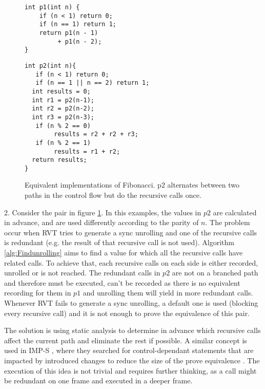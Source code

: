 \begin{figure}[h]
\begin{center}
\begin{minipage}{7 cm}
\begin{lstlisting}
int p1(int n) {
    if (n < 1) return 0;
    if (n == 1) return 1;
    return p1(n - 1) 
         + p1(n - 2);
}
\end{lstlisting}
\end{minipage}
\begin{minipage}{7 cm}
\begin{lstlisting}
int p2(int n){
   if (n < 1) return 0;
   if (n == 1 || n == 2) return 1; 
  int results = 0;
  int r1 = p2(n-1);
  int r2 = p2(n-2);
  int r3 = p2(n-3);
   if (n % 2 == 0)
        results = r2 + r2 + r3;
   if (n % 2 == 1)
        results = r1 + r2;
  return results;
}
\end{lstlisting}
\end{minipage}
\caption{Equivalent implementations of Fibonacci. p2 alternates between two paths in the control flow but do the recursive calls once.}
\label{fig:redundentcalls}
\end{center}
\end{figure}

2. Consider the pair in figure \ref{fig:redundentcalls}. In this examples, the values in $p2$ are calculated in advance, and are used differently according to the parity of $n$. The problem occur when RVT tries to generate a sync unrolling and one of the recursive calls is redundant (e.g. the result of that recursive call is not used). Algorithm \ref{alg:Findunrolling} aims to find a value for which all the recursive calls have related calls. To achieve that, each recursive calls on each side is either recorded, unrolled or is not reached. The redundant calls in $p2$ are not on a branched path and therefore must be executed, can't be recorded as there is no equivalent recording for them in $p1$ and unrolling them will yield in more redundant calls. Whenever RVT fails to generate a sync unrolling, a default one is used (blocking every recursive call) and it is not enough to prove the equivalence of this pair.

The solution is using static analysis to determine in advance which recursive calls affect the current path and eliminate the rest if possible. A similar concept is used in IMP-S \cite{inproceedings}, where they searched for control-dependant statements that are impacted by introduced changes to reduce the size of the prove equivalence . The execution of this idea is not trivial and requires further thinking, as a call might be redundant on one frame and executed in a deeper frame.

